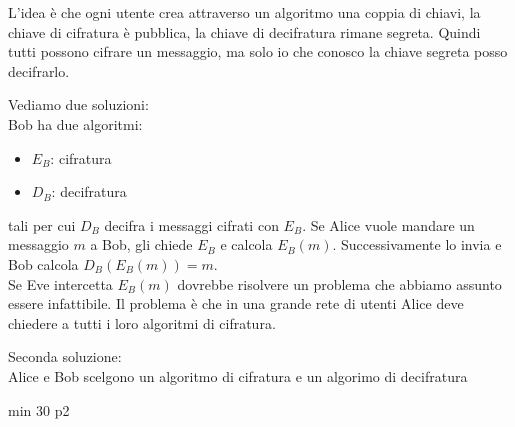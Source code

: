 L'idea è che ogni utente crea attraverso un algoritmo una coppia di chiavi, la chiave di cifratura è pubblica, la chiave di decifratura rimane segreta. Quindi tutti possono cifrare un messaggio, ma solo io che conosco la chiave segreta posso decifrarlo.


Vediamo due soluzioni:\\
Bob ha due algoritmi:
\begin{itemize}
	\item $E_B$: cifratura
	\item $D_B$: decifratura
\end{itemize}
tali per cui $D_B$ decifra i messaggi cifrati con $E_B$.
Se Alice vuole mandare un messaggio $m$ a Bob, gli chiede $E_B$ e calcola $E_B(m)$. Successivamente lo invia e Bob calcola $D_B(E_B(m)) = m$.\\
Se Eve intercetta $E_B(m)$ dovrebbe risolvere un problema che abbiamo assunto essere infattibile.
Il problema è che in una grande rete di utenti Alice deve chiedere a tutti i loro algoritmi di cifratura.

Seconda soluzione:\\
Alice e Bob scelgono un algoritmo di cifratura e un algorimo di decifratura

min 30 p2


